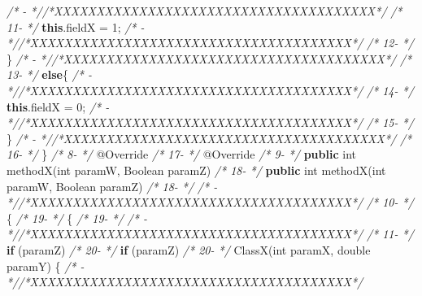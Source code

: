 \documentclass[
]{article}
\newenvironment{Shaded}{\begin{snugshade}}{\end{snugshade}}
\newcommand{\AttributeTok}[1]{\textcolor[rgb]{0.77,0.63,0.00}{#1}}
\newcommand{\BuiltInTok}[1]{#1}
\newcommand{\CommentTok}[1]{\textcolor[rgb]{0.56,0.35,0.01}{\textit{#1}}}
\newcommand{\DataTypeTok}[1]{\textcolor[rgb]{0.13,0.29,0.53}{#1}}
\newcommand{\DecValTok}[1]{\textcolor[rgb]{0.00,0.00,0.81}{#1}}
\newcommand{\FunctionTok}[1]{\textcolor[rgb]{0.00,0.00,0.00}{#1}}
\newcommand{\KeywordTok}[1]{\textcolor[rgb]{0.13,0.29,0.53}{\textbf{#1}}}
\newcommand{\NormalTok}[1]{#1}
\begin{document}
\begin{landscape}
\begin{Shaded}
\begin{Highlighting}[]
\CommentTok{/*   -   *//*XXXXXXXXXXXXXXXXXXXXXXXXXXXXXXXXXXXXXX*/}               \CommentTok{/* 11-   */}            \KeywordTok{this}\NormalTok{.}\FunctionTok{fieldX}\NormalTok{ = }\DecValTok{1}\NormalTok{;                             }
\CommentTok{/*   -   *//*XXXXXXXXXXXXXXXXXXXXXXXXXXXXXXXXXXXXXX*/}               \CommentTok{/* 12-   */}\NormalTok{        \}                                                }
\CommentTok{/*   -   *//*XXXXXXXXXXXXXXXXXXXXXXXXXXXXXXXXXXXXXX*/}               \CommentTok{/* 13-   */}        \KeywordTok{else}\NormalTok{\{                                            }
\CommentTok{/*   -   *//*XXXXXXXXXXXXXXXXXXXXXXXXXXXXXXXXXXXXXX*/}               \CommentTok{/* 14-   */}            \KeywordTok{this}\NormalTok{.}\FunctionTok{fieldX}\NormalTok{ = }\DecValTok{0}\NormalTok{;                             }
\CommentTok{/*   -   *//*XXXXXXXXXXXXXXXXXXXXXXXXXXXXXXXXXXXXXX*/}               \CommentTok{/* 15-   */}\NormalTok{        \}                                                }
\CommentTok{/*   -   *//*XXXXXXXXXXXXXXXXXXXXXXXXXXXXXXXXXXXXXX*/}               \CommentTok{/* 16-   */}\NormalTok{    \}                                                    }
\CommentTok{/*  8-   */}    \AttributeTok{@Override}                                            \CommentTok{/* 17-   */}    \AttributeTok{@Override}                                            
\CommentTok{/*  9-   */}    \KeywordTok{public} \DataTypeTok{int} \FunctionTok{methodX}\NormalTok{(}\DataTypeTok{int}\NormalTok{ paramW, }\BuiltInTok{Boolean}\NormalTok{ paramZ)       }\CommentTok{/* 18-   */}    \KeywordTok{public} \DataTypeTok{int} \FunctionTok{methodX}\NormalTok{(}\DataTypeTok{int}\NormalTok{ paramW, }\BuiltInTok{Boolean}\NormalTok{ paramZ)       }
\CommentTok{/* 18-   */}                                                         \CommentTok{/*   -   *//*XXXXXXXXXXXXXXXXXXXXXXXXXXXXXXXXXXXXXX*/}               
\CommentTok{/* 10-   */}\NormalTok{    \{                                                    }\CommentTok{/* 19-   */}\NormalTok{    \{                                                    }
\CommentTok{/* 19-   */}                                                         \CommentTok{/*   -   *//*XXXXXXXXXXXXXXXXXXXXXXXXXXXXXXXXXXXXXX*/}               
\CommentTok{/* 11-   */}        \KeywordTok{if}\NormalTok{ (paramZ)                                      }\CommentTok{/* 20-   */}        \KeywordTok{if}\NormalTok{ (paramZ)                                      }
\CommentTok{/* 20-   */}    \FunctionTok{ClassX}\NormalTok{(}\DataTypeTok{int}\NormalTok{ paramX, }\DataTypeTok{double}\NormalTok{ paramY) \{                        }\CommentTok{/*   -   *//*XXXXXXXXXXXXXXXXXXXXXXXXXXXXXXXXXXXXXX*/}               

\end{Highlighting}
\end{Shaded}
\end{landscape}
\end{document}
